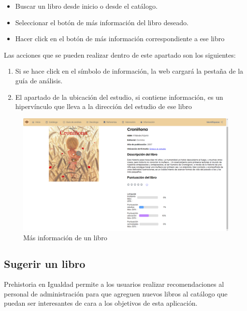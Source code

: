 \begin{itemize}
    \item Buscar un libro desde inicio o desde el catálogo.
    \item Seleccionar el botón de más información del libro deseado.
    \item Hacer click en el botón de más información correspondiente a ese libro
\end{itemize}
Las acciones que se pueden realizar dentro de este apartado son los siguientes:
\begin{enumerate}
    \item Si se hace click en el símbolo de información, la web cargará la pestaña de la guía de análisis.
    \item El apartado de la ubicación del estudio, si contiene información, es un hipervínculo que lleva a la dirección del estudio de ese libro
\end{enumerate}
\begin{figure}[h]
    \centering
    \includegraphics[width=1\linewidth]{Imagenes/ManualMasInfo.png}
    \caption{Más información de un libro}
    \label{Más información de un libro}
\end{figure}
\FloatBarrier

\subsection{Sugerir un libro}
Prehistoria en Igualdad permite a los usuarios realizar recomendaciones al personal de administración para que agreguen nuevos libros al catálogo que puedan ser interesantes de cara a los objetivos de esta aplicación.

